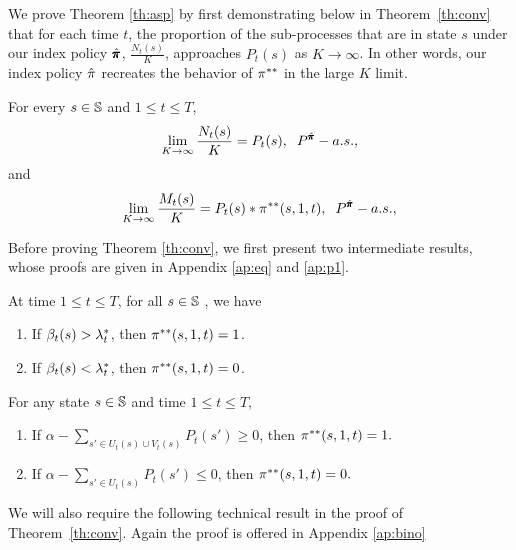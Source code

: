 We prove Theorem \ref{th:asp} by first demonstrating below in Theorem~\ref{th:conv} that for each time $t$,
the proportion of the sub-processes that are in state $s$ under our index policy $\hat{\pmb{\pi}}$,
$\frac{N_t(s)}{K}$, approaches $P_t(s)$ as $K\rightarrow \infty$. 
In other words, our index policy $\hat{\pi}$ recreates the behavior of $\pi^{**}$ in the large $K$ limit.
\begin{theorem}\label{th:conv}
For every $s\in\mathbb{S}$ and $1\leq t\leq T$,
\begin{equation}\label{conv1}
\lim_{K\rightarrow\infty}\frac{N_t(s)}{K} = P_t(s), \hspace{2mm} P^{\hat{\pmb{\pi}}}-a.s.,
\end{equation}
and
\begin{equation}\label{conv2}
\lim_{K\rightarrow\infty}\frac{M_t(s)}{K} = P_t(s)*\pi^{**}(s,1,t), \hspace{2mm} P^{\hat{\pmb{\pi}}}-a.s., 
\end{equation}
\end{theorem}
Before proving Theorem \ref{th:conv}, we first present two intermediate results, whose proofs are given in Appendix \ref{ap:eq} and \ref{ap:p1}.
\begin{lemma}\label{th:eq}
At time $1\leq t\leq T$, for all $s\in\mathbb{S}$ , we have
\begin{enumerate}[(1)]
    \item If $\beta_t(s)>\lambda^*_t$, then $\pi^{**}(s,1,t) = 1$.
    \item If $\beta_t(s)<\lambda^*_t$, then $\pi^{**}(s,1,t) = 0$.
\end{enumerate}
\end{lemma}

\begin{lemma}\label{th:p1}
For any state $s\in\mathbb{S}$ and time $1\leq t\leq T$, 
\begin{enumerate}[(1)]
\item If $\alpha-\sum_{s'\in U_{t}(s)\cup V_{t}(s)}P_{t}(s')\geq 0$, then $\pi^{**}(s,1,t) = 1.$
\item If $\alpha-\sum_{s'\in U_{t}(s)}P_{t}(s') \leq 0$, then $\pi^{**}(s,1,t) = 0.$
\end{enumerate}

\end{lemma}


We will also require the following technical result in the proof of Theorem~\ref{th:conv}. Again the proof is offered in Appendix \ref{ap:bino}


